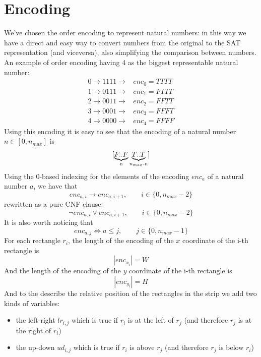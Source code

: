 \section{Encoding}
We've chosen the order encoding to represent natural numbers: in this way we have a direct and easy way to convert numbers from the original to the SAT representation (and viceversa), also simplifying the comparison between numbers.
\newline
An example of order encoding having 4 as the biggest representable natural number:
\begin{align*}
0 \rightarrow 1 1 1 1 \rightarrow& enc_0 = TTTT \\
1 \rightarrow 0 1 1 1 \rightarrow& enc_1 = FTTT \\
2 \rightarrow 0 0 1 1 \rightarrow& enc_2 = FFTT \\
3 \rightarrow 0 0 0 1 \rightarrow& enc_3 =  FFFT \\
4 \rightarrow 0 0 0 0 \rightarrow& enc_4 = FFFF
\end{align*}
\newline
Using this encoding it is easy to see that the encoding of a natural number $n \in [0, n_{max}]$ is $$[ \space \underbrace{F..F}_\text{n} \space \underbrace{T..T}_\text{$n_{max}$-n}]$$ 
\newline
Using the 0-based indexing for the elements of the encoding $enc_a$ of a natural number $a$, we have that 
$$enc_{a,i} \rightarrow enc_{a,i+1}, \qquad i \in \{0,n_{max}-2\}$$
\newline
rewritten as a pure CNF clause:
$$\neg enc_{a,i} \vee enc_{a,i+1}, \qquad i \in \{0,n_{max}-2\}$$
\newline
It is also worth noticing that 
$$enc_{a,j} \Leftrightarrow a \leq j, \qquad j \in \{ 0,n_{max}-1\}$$
\newline
For each rectangle $r_{i}$, the length of the encoding of the $x$ coordinate of the i-th rectangle is 
$$ | enc_{x_{i}} | = W $$
And the length of the encoding of the $y$ coordinate of the i-th rectangle is
$$ | enc_{y_{i}} | = H $$
And to the describe the relative position of the rectangles in the strip we add two kinds of variables: 
\begin{itemize}
\item the left-right $lr_{i,j}$ which is true if $r_i$ is at the left of $r_j$ (and therefore $r_j$ is at the right of $r_i$)
\item the up-down $ud_{i,j}$ which is true if $r_i$ is above $r_j$ (and therefore $r_j$ is below $r_i$)
\end{itemize}
